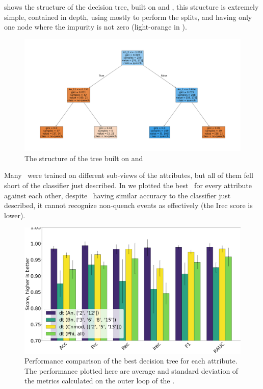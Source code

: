  shows the structure of the decision tree, built on \an[2] and \an[12], this
structure is extremely simple, contained in depth, using mostly \an[2] to perform the splits, and
having only one node where the impurity is not zero (light-orange in ).
\begin{figure}[!ht]
	\centering
	\includegraphics[width=\linewidth]{img/An_2_12_pt_dt.png}
	\caption{The structure of the tree built on \an[2] and \an[12]} \label{fig:dt-an-2-12-pt}
\end{figure}
Many \dts\ were trained on different sub-views of the attributes, but all of them fell short
of the classifier just described. In  we plotted the best \dt\ for every
attribute against each other, despite \cnmod\ having similar accuracy to the classifier just
described, it cannot recognize non-quench events as effectively (the Irec score is lower).
\begin{figure}[!ht]
	\centering
	\includegraphics[width=\linewidth]{img/best_dts.png}
	\caption{Performance comparison of the best decision tree for each attribute. The
		performance plotted here are average and standard deviation of the metrics calculated on the
		outer loop of the \ncv.} \label{fig:best-dts}
\end{figure}

